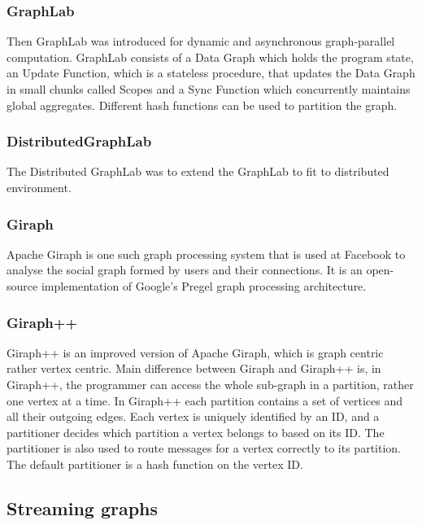 \documentclass[12pt]{article}
\begin{document}
\subsubsection{GraphLab}

Then GraphLab\cite{Graphlab} \cite{DistributedGraphLab} was introduced for dynamic and asynchronous graph-parallel computation. GraphLab consists of a Data Graph which holds the program state, an Update Function, which is a stateless procedure, that updates the Data Graph in small chunks called Scopes and a Sync Function which concurrently maintains global aggregates. Different hash functions can be used to partition the graph. 

\subsubsection{DistributedGraphLab}

The Distributed GraphLab \cite{DistributedGraphLab} was to extend the GraphLab to fit to distributed environment.  

\subsubsection{Giraph}
Apache Giraph is one such graph processing system that is used at Facebook to analyse the social graph formed by users and their connections. It is an open-source implementation of Google’s Pregel\cite{Pregel} graph processing architecture. 

\subsubsection{Giraph++}
Giraph++\cite{GiraphPlusPlus} is an improved version of Apache Giraph, which is graph centric rather vertex centric. Main difference between Giraph and Giraph++ is, in Giraph++, the programmer can access the whole sub-graph in a partition, rather one vertex at a time. In Giraph++ each partition contains a set of vertices and all their outgoing edges. Each vertex is uniquely identified by an ID, and a partitioner decides which partition a vertex belongs to based on its ID. The partitioner is also used to route messages for a vertex correctly to its partition. The default partitioner is a hash function on the vertex ID.

\subsection{Streaming graphs}
\end{document}
